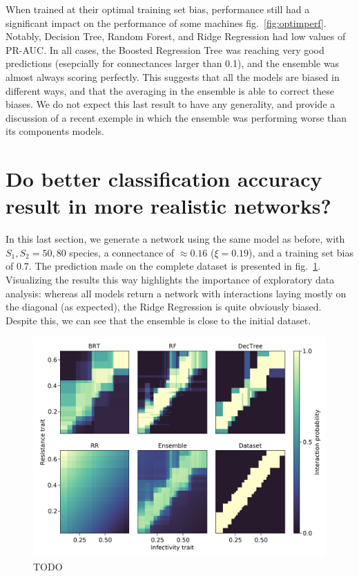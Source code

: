 \documentclass[11pt]{article}
\makeatletter
\def\maxwidth{\ifdim\Gin@nat@width>\linewidth\linewidth
\else\Gin@nat@width\fi}
\let\Oldincludegraphics\includegraphics
\renewcommand{\includegraphics}[1]{\Oldincludegraphics[width=\maxwidth]{#1}}
\makeatother
\begin{document}
When trained at their optimal training set bias, performance still had a
significant impact on the performance of some machines
fig.~\ref{fig:optimperf}. Notably, Decision Tree, Random Forest, and
Ridge Regression had low values of PR-AUC. In all cases, the Boosted
Regression Tree was reaching very good predictions (esepcially for
connectances larger than 0.1), and the ensemble was almost always
scoring perfectly. This suggests that all the models are biased in
different ways, and that the averaging in the ensemble is able to
correct these biases. We do not expect this last result to have any
generality, and provide a discussion of a recent exemple in which the
ensemble was performing worse than its components models.

\hypertarget{do-better-classification-accuracy-result-in-more-realistic-networks}{%
\section{Do better classification accuracy result in more realistic
networks?}\label{do-better-classification-accuracy-result-in-more-realistic-networks}}

In this last section, we generate a network using the same model as
before, with \(S_1, S_2 = 50, 80\) species, a connectance of
\(\approx 0.16\) (\(\xi = 0.19\)), and a training set bias of \(0.7\).
The prediction made on the complete dataset is presented in
fig.~\ref{fig:ecovalid}. Visualizing the results this way highlights the
importance of exploratory data analysis: whereas all models return a
network with interactions laying mostly on the diagonal (as expected),
the Ridge Regression is quite obviously biased. Despite this, we can see
that the ensemble is close to the initial dataset.

\begin{figure}
\hypertarget{fig:ecovalid}{%
\centering
\includegraphics{figures/valid_ensemble.png}
\caption{TODO}\label{fig:ecovalid}
}
\end{figure}
\end{document}
